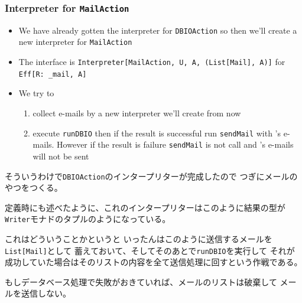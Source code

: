 \begin{frame}
  \frametitle{Interpreter for \lstinline|MailAction|}

  \pause
  \begin{itemize}
    \item<+-> We have already gotten the interpreter for \lstinline|DBIOAction|
    so then we'll create a new interpreter for \lstinline|MailAction|

    \item<+-> The interface is
    \lstinline|Interpreter[MailAction, U, A, (List[Mail], A)]| for
    \lstinline|Eff[R: _mail, A]|

    \item<+-> We try to
    \begin{enumerate}
      \item \label{enum:collect_email}
      collect e-mails by a new interpreter we'll create from now

      \item execute \lstinline|runDBIO| then if the result is successful
      run \lstinline|sendMail| with 's e-mails.
      However if the result is failure \lstinline|sendMail| is not call
      and 's e-mails will not be sent
    \end{enumerate}
  \end{itemize}

  
  \begin{notes}
    \item そういうわけで\lstinline|DBIOAction|のインタープリターが完成したので
    つぎにメールのやつをつくる。

    \item 定義時にも述べたように、これのインタープリターはこのように結果の型が
    \lstinline|Writer|モナドのタプルのようになっている。

    \item これはどういうことかというと
    いったんはこのように送信するメールを\lstinline|List[Mail]|として
    蓄えておいて、そしてそのあとで\lstinline|runDBIO|を実行して
    それが成功していた場合はそのリストの内容を全て送信処理に回すという作戦である。

    \item もしデータベース処理で失敗がおきていれば、メールのリストは破棄して
    メールを送信しない。
  \end{notes}
\end{frame}

